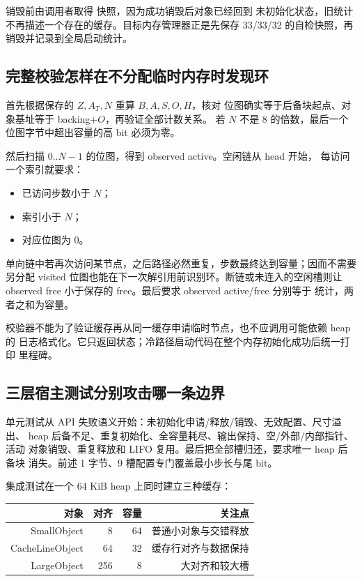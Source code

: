销毁前由调用者取得  快照，因为成功销毁后对象已经回到
未初始化状态，旧统计不再描述一个存在的缓存。目标内存管理器正是先保存
33/33/32 的自检快照，再销毁并记录到全局启动统计。

\subsection{完整校验怎样在不分配临时内存时发现环}

 首先根据保存的 \(Z,A_T,N\) 重算 \(B,A,S,O,H\)，核对
位图确实等于后备块起点、对象基址等于 backing+\(O\)，再验证全部计数关系。
若 \(N\) 不是 8 的倍数，最后一个位图字节中超出容量的高 bit 必须为零。

然后扫描 \(0..N-1\) 的位图，得到 observed active。空闲链从 head 开始，
每访问一个索引就要求：

\begin{itemize}
  \item 已访问步数小于 \(N\)；
  \item 索引小于 \(N\)；
  \item 对应位图为 0。
\end{itemize}

单向链中若再次访问某节点，之后路径必然重复，步数最终达到容量；因而不需要
另分配 visited 位图也能在下一次解引用前识别环。断链或未连入的空闲槽则让
observed free 小于保存的 free。最后要求 observed active/free 分别等于
统计，两者之和为容量。

校验器不能为了验证缓存再从同一缓存申请临时节点，也不应调用可能依赖 heap 的
日志格式化。它只返回状态；冷路径启动代码在整个内存初始化成功后统一打印
里程碑。

\subsection{三层宿主测试分别攻击哪一条边界}

单元测试从 API 失败语义开始：未初始化申请/释放/销毁、无效配置、尺寸溢出、
heap 后备不足、重复初始化、全容量耗尽、输出保持、空/外部/内部指针、活动
对象销毁、重复释放和 LIFO 复用。最后把全部槽归还，要求唯一 heap 后备块
消失。前述 1 字节、9 槽配置专门覆盖最小步长与尾 bit。

集成测试在一个 64 KiB heap 上同时建立三种缓存：

\begin{center}
\begin{tabular}{rrrr}
\toprule
对象 & 对齐 & 容量 & 关注点\\
\midrule
SmallObject & 8 & 64 & 普通小对象与交错释放\\
CacheLineObject & 64 & 32 & 缓存行对齐与数据保持\\
LargeObject & 256 & 8 & 大对齐和较大槽\\
\bottomrule
\end{tabular}
\end{center}

